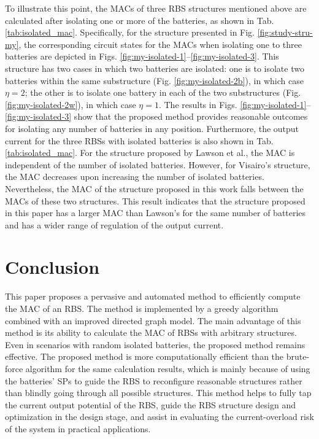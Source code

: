 \documentclass{article}
\begin{document}
To illustrate this point, the MACs of three RBS structures mentioned above are calculated after isolating one or more of the batteries, as shown in Tab. \ref{tab:isolated_mac}. 
Specifically, for the structure presented in Fig. \ref{fig:study-stru-my}, the corresponding circuit states for the MACs when isolating one to three batteries are depicted in Figs. \ref{fig:my-isolated-1}--\ref{fig:my-isolated-3}. 
This structure has two cases in which two batteries are isolated: 
one is to isolate two batteries within the same substructure (Fig. \ref{fig:my-isolated-2b}), in which case $\eta=2$; the other is to isolate one battery in each of the two substructures (Fig. \ref{fig:my-isolated-2w}), in which case $\eta=1$. 
The results in Figs. \ref{fig:my-isolated-1}--\ref{fig:my-isolated-3} show that the proposed method provides reasonable outcomes for isolating any number of batteries in any position.
Furthermore, the output current for the three RBSs with isolated batteries is also shown in Tab. \ref{tab:isolated_mac}. 
For the structure proposed by Lawson et al., the MAC is independent of the number of isolated batteries.
However, for Visairo's structure, the MAC decreases upon increasing the number of isolated batteries. 
Nevertheless, the MAC of the structure proposed in this work falls between the MACs of these two structures. 
This result indicates that the structure proposed in this paper has a larger MAC than Lawson's for the same number of batteries and has a wider range of regulation of the output current. 

\section{Conclusion}

This paper proposes a pervasive and automated method to efficiently compute the MAC of an RBS.
The method is implemented by a greedy algorithm combined with an improved directed graph model.
The main advantage of this method is its ability to calculate the MAC of RBSs with arbitrary structures.
Even in scenarios with random isolated batteries, the proposed method remains effective.
The proposed method is more computationally efficient than the brute-force algorithm for the same calculation results, which is mainly because of using the batteries' SPs to guide the RBS to reconfigure reasonable structures rather than blindly going through all possible structures.
This method helps to fully tap the current output potential of the RBS, guide the RBS structure design and optimization in the design stage, and assist in evaluating the current-overload risk of the system in practical applications.
\end{document}
